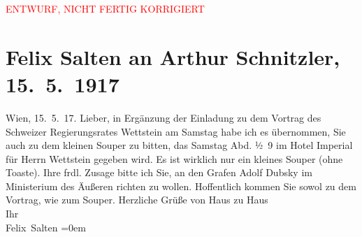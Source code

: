 
\begin{center}
            \textcolor{red}{ENTWURF, NICHT FERTIG KORRIGIERT}
                      \end{center}
            
         
         \renewcommand{\erwaehntePersonen}{Personen: Adolf Oswald von Dubsky-Třembomyslic, Oscar Wettstein}
         \renewcommand{\erwaehnteInstitutionen}{Institutionen: Ministerium für Äußeres}
         \renewcommand{\erwaehnteOrte}{Orte: Hotel Imperial, Schweiz, Wien}
         \renewcommand{\erwaehnteWerke}{}
               \section[Felix Salten an Arthur Schnitzler, 15. 5. 1917]{ Felix Salten an Arthur Schnitzler, 15. 5. 1917}\nopagebreak{}\rehead{ }\begin{ledgroupsized}[t]{13cm}\normalsize\beginnumbering \toendnotes[C]{\smallbreak\pagebreak[2]} 
\pstart
           {\pb}Wien, 15. 5. 17. \pend
           \pstart{}Lieber,\pend\pstart
           in Ergänzung der Einladung zu dem Vortrag des Schweizer
               Regierungsrates Wettstein am Samstag habe
               ich es übernommen, Sie auch zu dem kleinen Souper zu bitten, das Samstag Abd.
               ½ 9 im Hotel Imperial für Herrn Wettstein gegeben wird. Es ist wirklich nur ein kleines Souper (ohne
               Toaste). Ihre frdl. Zusage bitte ich Sie, an den Grafen 
                  Adolf Dubsky im Ministerium des Äußeren richten zu
               wollen. Hoffentlich kommen Sie sowol zu dem Vortrag, wie zum Souper.\pend
           \pstart
           Herzliche Grüße von Haus zu Haus {\\[\baselineskip]}Ihr {\\[\baselineskip]}\spacefill\mbox{Felix Salten}\pend
           \leftskip=0em{}
         
         \endnumbering{}\end{ledgroupsized}\begin{anhang}\end{anhang}\newcommand{\dateiname}{L03566}\newcommand{\titel}{Felix Salten an Arthur Schnitzler, 15. 5. 1917}\newcommand{\editorInnen}{Martin Anton Müller und Laura Untner}
      